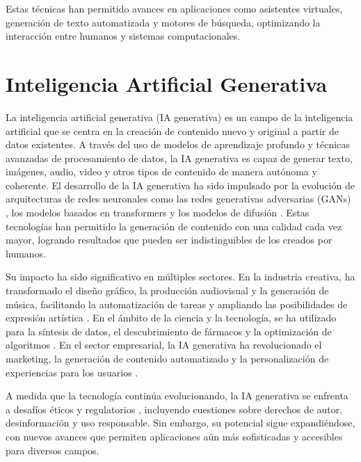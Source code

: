 Estas técnicas han permitido avances en aplicaciones como asistentes virtuales, generación de texto automatizada y motores de búsqueda, optimizando la interacción entre humanos y sistemas computacionales.






\section{Inteligencia Artificial Generativa}

La inteligencia artificial generativa (IA generativa) es un campo de la inteligencia artificial que se centra en la creación de contenido nuevo y original a partir de datos existentes. 
A través del uso de modelos de aprendizaje profundo y técnicas avanzadas de procesamiento de datos, la IA generativa es capaz de generar texto, imágenes, audio, video y otros tipos de contenido de manera autónoma y coherente.  
El desarrollo de la IA generativa ha sido impulsado por la evolución de arquitecturas de redes neuronales como las redes generativas adversarias (GANs) \cite{goodfellow2014generativeadversarialnetworks}, los modelos basados en transformers \cite{vaswani2023attentionneed} y los modelos de difusión \cite{yang2024diffusionmodelscomprehensivesurvey}. 
Estas tecnologías han permitido la generación de contenido con una calidad cada vez mayor, logrando resultados que pueden ser indistinguibles de los creados por humanos.  

Su impacto ha sido significativo en múltiples sectores. 
En la industria creativa, ha transformado el diseño gráfico, la producción audiovisual y la generación de música, facilitando la automatización de tareas y ampliando las posibilidades de expresión artística \cite{iagengraphicdesign}. 
En el ámbito de la ciencia y la tecnología, se ha utilizado para la síntesis de datos, el descubrimiento de fármacos y la optimización de algoritmos \cite{ding2024risegenerativeartificialintelligence}. 
En el sector empresarial, la IA generativa ha revolucionado el marketing, la generación de contenido automatizado y la personalización de experiencias para los usuarios \cite{genaibusiness}.  

A medida que la tecnología continúa evolucionando, la IA generativa se enfrenta a desafíos éticos y regulatorios \cite{Hagendorff_2024}, incluyendo cuestiones sobre derechos de autor, desinformación y uso responsable. Sin embargo, su potencial sigue expandiéndose, con nuevos avances que permiten aplicaciones aún más sofisticadas y accesibles para diversos campos.



